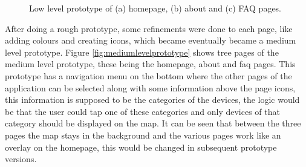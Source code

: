\begin{figure}
\begin{subfigure}{0.33\textwidth}
        \caption{}
        \label{fig:lowfaq}
    \end{subfigure}%
    \caption{Low level prototype of (a) homepage, (b) about and (c) FAQ pages.}
    \label{fig:lowlevelprototype}
\end{figure}

After doing a rough prototype, some refinements were done to each page, like
adding colours and creating icons, which became eventually became a medium level
prototype. Figure \ref{fig:mediumlevelprototype} shows tree pages of the medium level
prototype, these being the homepage, about
and faq pages. This prototype has a navigation menu on the bottom where the
other pages of the application can be selected along with some information
above the page icons, this information is supposed to be the categories of
the devices, the logic would be that the user could tap one of these categories
and only devices of that category should be displayed on the map. It can
be seen that between the three pages the map stays in the background and
the various pages work like an overlay on the homepage, this would be
changed in subsequent prototype versions.

